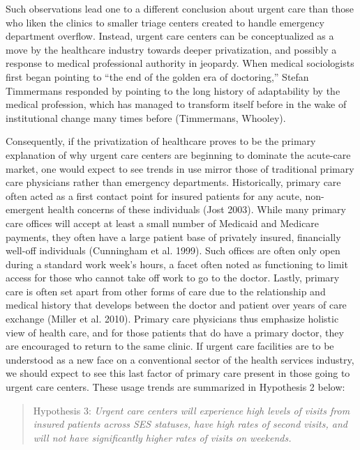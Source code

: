 \documentclass[12pt,twoside]{reedthesis}
\begin{document}
  Such observations lead one to a different conclusion about urgent care
  than those who liken the clinics to smaller triage centers created to
  handle emergency department overflow. Instead, urgent care centers can
  be conceptualized as a move by the healthcare industry towards deeper
  privatization, and possibly a response to medical professional authority
  in jeopardy. When medical sociologists first began pointing to ``the end
  of the golden era of doctoring,'' Stefan Timmermans responded by
  pointing to the long history of adaptability by the medical profession,
  which has managed to transform itself before in the wake of
  institutional change many times before (Timmermans, Whooley).
  
  Consequently, if the privatization of healthcare proves to be the
  primary explanation of why urgent care centers are beginning to dominate
  the acute-care market, one would expect to see trends in use mirror
  those of traditional primary care physicians rather than emergency
  departments. Historically, primary care often acted as a first contact
  point for insured patients for any acute, non-emergent health concerns
  of these individuals (Jost 2003). While many primary care offices will
  accept at least a small number of Medicaid and Medicare payments, they
  often have a large patient base of privately insured, financially
  well-off individuals (Cunningham et al. 1999). Such offices are often
  only open during a standard work week's hours, a facet often noted as
  functioning to limit access for those who cannot take off work to go to
  the doctor. Lastly, primary care is often set apart from other forms of
  care due to the relationship and medical history that develops between
  the doctor and patient over years of care exchange (Miller et al. 2010).
  Primary care physicians thus emphasize holistic view of health care, and
  for those patients that do have a primary doctor, they are encouraged to
  return to the same clinic. If urgent care facilities are to be
  understood as a new face on a conventional sector of the health services
  industry, we should expect to see this last factor of primary care
  present in those going to urgent care centers. These usage trends are
  summarized in Hypothesis 2 below:
  
  \begin{quote}
  Hypothesis 3: \emph{Urgent care centers will experience high levels of
  visits from insured patients across SES statuses, have high rates of
  second visits, and will not have significantly higher rates of visits on
  weekends.}
  \end{quote}
  
\end{document}
